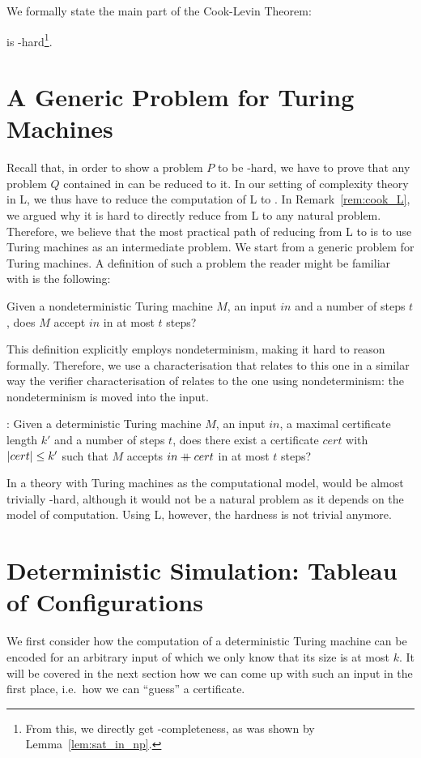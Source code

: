We formally state the main part of the Cook-Levin Theorem:
\begin{theorem}
  \SAT{} is \NP{}-hard\footnote{From this, we directly get \NP{}-completeness, as was shown by Lemma~\ref{lem:sat_in_np}.}.
\end{theorem}

\section{A Generic Problem for Turing Machines}
Recall that, in order to show a problem $P$ to be \NP{}-hard, we have to prove that any problem $Q$ contained in \NP{} can be reduced to it. In our setting of complexity theory in L, we thus have to reduce the computation of L to \SAT{}.
In Remark~\ref{rem:cook_L}, we argued why it is hard to directly reduce from L to any natural problem. 
Therefore, we believe that the most practical path of reducing from L to \SAT{} is to use Turing machines as an intermediate problem. 
We start from a generic problem for Turing machines. A definition of such a problem the reader might be familiar with is the following:
\begin{center}
  Given a nondeterministic Turing machine $M$, an input $in$ and a number of steps $t$, does $M$ accept $in$ in at most $t$ steps?
\end{center}
This definition explicitly employs nondeterminism, making it hard to reason formally. Therefore, we use a characterisation that relates to this one in a similar way the verifier characterisation of \NP{} relates to the one using nondeterminism: the nondeterminism is moved into the input.
\begin{center}
  \gennp{}:
  Given a deterministic Turing machine $M$, an input $in$, a maximal certificate length $k'$ and a number of steps $t$, does there exist a certificate $cert$ with $|cert| \le k'$ such that $M$ accepts $in \mathbin{+\mkern-10mu+} cert$ in at most $t$ steps?
\end{center}

In a theory with Turing machines as the computational model, \gennp{} would be almost trivially \NP{}-hard, although it would not be a natural problem as it depends on the model of computation.
Using L, however, the hardness is not trivial anymore. 

\section{Deterministic Simulation: Tableau of Configurations}
We first consider how the computation of a deterministic Turing machine can be encoded for an arbitrary input of which we only know that its size is at most $k$. 
It will be covered in the next section how we can come up with such an input in the first place, i.e.\ how we can ``guess'' a certificate.

